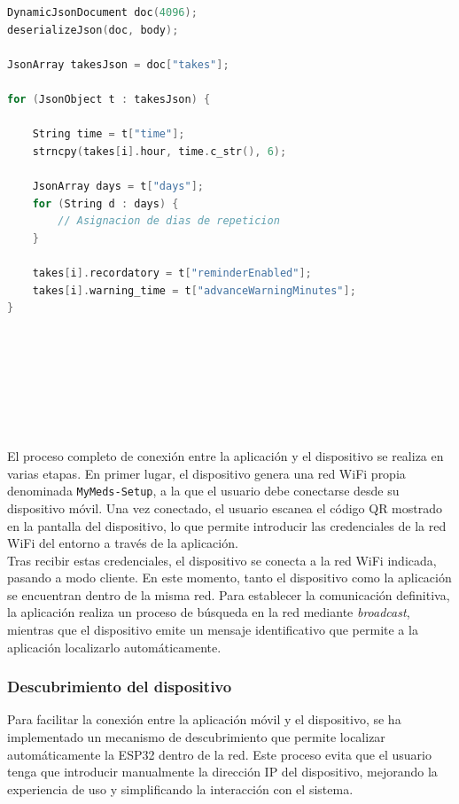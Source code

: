 \begin{code}[H]
\begin{lstlisting}[language=C++]
DynamicJsonDocument doc(4096);
deserializeJson(doc, body);

JsonArray takesJson = doc["takes"];

for (JsonObject t : takesJson) {

    String time = t["time"];
    strncpy(takes[i].hour, time.c_str(), 6);

    JsonArray days = t["days"];
    for (String d : days) {
        // Asignacion de dias de repeticion
    }

    takes[i].recordatory = t["reminderEnabled"];
    takes[i].warning_time = t["advanceWarningMinutes"];
}
\end{lstlisting}
\caption{Procesamiento de datos JSON recibidos desde la aplicación}
\label{cod:json}
\end{code}

\

\

\

\

El proceso completo de conexión entre la aplicación y el dispositivo se realiza en varias etapas. En primer lugar, el dispositivo genera una red WiFi propia denominada \texttt{MyMeds-Setup}, a la que el usuario debe conectarse desde su dispositivo móvil. Una vez conectado, el usuario escanea el código QR mostrado en la pantalla del dispositivo, lo que permite introducir las credenciales de la red WiFi del entorno a través de la aplicación.\\

Tras recibir estas credenciales, el dispositivo se conecta a la red WiFi indicada, pasando a modo cliente. En este momento, tanto el dispositivo como la aplicación se encuentran dentro de la misma red. Para establecer la comunicación definitiva, la aplicación realiza un proceso de búsqueda en la red mediante \textit{broadcast}, mientras que el dispositivo emite un mensaje identificativo que permite a la aplicación localizarlo automáticamente.\\

\subsubsection{Descubrimiento del dispositivo}
\label{sec:descubrimiento}

Para facilitar la conexión entre la aplicación móvil y el dispositivo, se ha implementado un mecanismo de descubrimiento que permite localizar automáticamente la ESP32 dentro de la red. Este proceso evita que el usuario tenga que introducir manualmente la dirección IP del dispositivo, mejorando la experiencia de uso y simplificando la interacción con el sistema.\\

